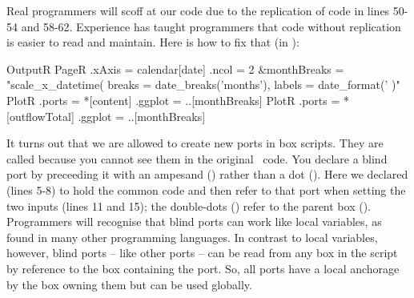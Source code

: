 Real programmers will scoff at our code due to the replication of code in lines 50-54 and 58-62. Experience has taught programmers that code without replication is easier to read and maintain. Here is how to fix that (in ):

\lstset{numbers=left}
\begin{boxscript}
OutputR {
  PageR {
    .xAxis = calendar[date]
    .ncol = 2
    &monthBreaks = "scale_x_datetime(
                      breaks = date_breaks('months'), 
                      labels = date_format('%
                    )" 
    PlotR {
      .ports = *[content]
      .ggplot = ..[monthBreaks]
    }
    PlotR {
      .ports = *[outflowTotal]
      .ggplot = ..[monthBreaks]
    }
  }
} 
\end{boxscript}
\lstset{numbers=none}

It turns out that we are allowed to create new ports in box scripts. They are called  because you cannot see them in the original \CPP\ code. You declare a blind port by preceeding it with an ampesand (\code{&}) rather than a dot (). Here we declared  (lines 5-8) to hold the common code and then refer to that port when setting the two  inputs (lines 11 and 15); the double-dots () refer to the parent box (). Programmers will recognise that blind ports can work like local variables, as found in many other programming languages. In contrast to local variables, however, blind ports -- like other ports -- can be read from any box in the script by reference to the box containing the port. So, all ports have a local anchorage by the box owning them but can be used globally.

